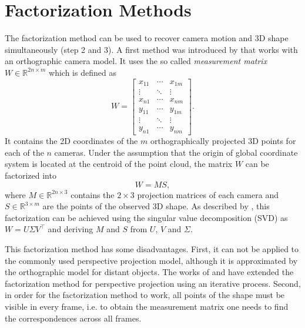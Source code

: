	\section{Factorization Methods}
		The factorization method can be used to recover camera motion and 3D shape simultaneously (step 2 and 3).
		A first method was introduced by \cite{tomasi1992factorization} that works with an orthographic camera model.
		It uses the so called \emph{measurement matrix} $W \in \mathbb{R}^{2n \times m}$ which is defined as
		\begin{equation}\label{eq:measurement_matrix}
			W =
			\begin{bmatrix}
				x_{11} & \cdots & x_{1m} \\ 
				\vdots & \ddots & \vdots \\ 
				x_{n1} & \cdots & x_{nm} \\ 
				y_{11} & \cdots & y_{1m} \\ 
				\vdots & \ddots & \vdots \\ 
				y_{n1} & \cdots & y_{nm}
			\end{bmatrix}. 
		\end{equation}
		It contains the 2D coordinates of the $m$ orthographically projected 3D points for each of the $n$ cameras.
		Under the assumption that the origin of global coordinate system is located at the centroid of the point cloud, the matrix $W$ can be factorized into
		\begin{equation}\label{eq:factorization_method}
			W = MS,
		\end{equation}
		where $M \in \mathbb{R}^{2n \times 3}$ contains the $2 \times 3$ projection matrices of each camera and $S \in \mathbb{R}^{3 \times m}$  are the points of the observed 3D shape.
		As described by \cite{tomasi1992factorization}, this factorization can be achieved using the singular value decomposition (SVD) as $W = U \varSigma V^\top$ and deriving $M$ and $S$ from $U$, $V$ and $\varSigma$.
		
		This factorization method has some disadvantages.
		First, it can not be applied to the commonly used perspective projection model, although it is approximated by the orthographic model for distant objects.
		The works of \cite{sturm1996factorization} and \cite{christy1996euclidean} have extended the factorization method for perspective projection using an iterative process.
		Second, in order for the factorization method to work, all points of the shape must be visible in every frame, i.e. to obtain the measurement matrix one needs to find the correspondences across all frames.
		
